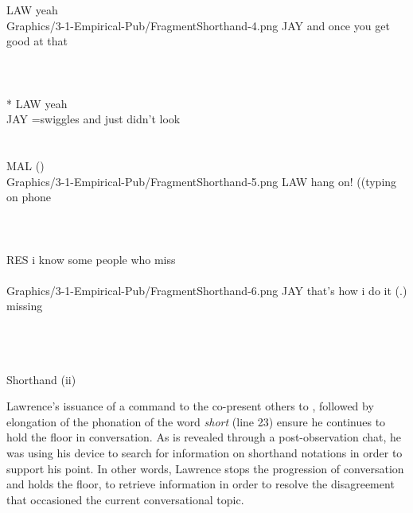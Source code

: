 \begin{revisedsubmission}
\begin{inlinefrag*}
    {
    \begin{transcript*}[12]
        \by LAW {\intDown{}yeah} \\
           {Graphics/3-1-Empirical-Pub/FragmentShorthand-4.png}
        \by JAY {and once you get good at that} \\
         \\
         \\
         \\*
        \by LAW {\intDown{}yeah} \\
        \by JAY {=swiggles and just didn't look} \\
         \\
         \\
        \by MAL {(\qquad \qquad \qquad \qquad )} \\
           {Graphics/3-1-Empirical-Pub/FragmentShorthand-5.png}
        \by LAW {hang on! ((typing on phone} \\
         \\
         \\
         \\
        \by RES {i know some people who miss} \\
         \\
           {Graphics/3-1-Empirical-Pub/FragmentShorthand-6.png}
        \by JAY {that's how i do it (.) missing} \\
         \\
         \\
         \\
    \end{transcript*}
    \caption{Shorthand (ii)}\label{frag:empirical pub findings contest-ii}
    }
\end{inlinefrag*}

Lawrence’s issuance of a command to the co-present others to , followed by elongation of the phonation of the word \textit{short} (line 23) ensure he continues to hold the floor in conversation.
As is revealed through a post-observation chat, he was using his device to search for information on shorthand notations in order to support his point.
In other words, Lawrence stops the progression of conversation and holds the floor, to retrieve information in order to resolve the disagreement that occasioned the current conversational topic.


\end{revisedsubmission}
